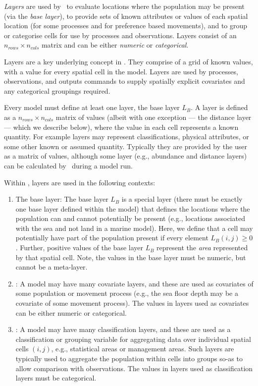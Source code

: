 \emph{Layers} are used by \SPM\ to evaluate locations where the population may be present (via the \emph{base layer}), to provide sets of known attributes or values of each spatial location (for some processes and for preference based movements), and to group or categorise cells for use by processes and observations. Layers consist of an $n_{rows} \times n_{cols}$ matrix and can be either \emph{numeric} or \emph{categorical}. 

Layers are a key underlying concept in \SPM. They comprise of a grid of known values, with a value for every spatial cell in the model. Layers are used by processes, observations, and outputs commands to supply spatially explicit covariates and any categorical groupings required. 

Every model must define at least one layer, the base layer $L_B$. A layer is defined as a $n_{rows} \times n_{cols}$ matrix of values (albeit with one exception --- the distance layer --- which we describe below), where the value in each cell represents a known quantity. For example layers may represent classifications, physical attributes, or some other known or assumed quantity. Typically they are provided by the user as a matrix of values, although some layer (e.g., abundance and distance layers) can be calculated by \SPM\ during a model run. 

Within \SPM, layers are used in the following contexts:
\begin{enumerate}
\item The base layer: The base layer $L_B$ is a special layer (there must be exactly one base layer defined within the model) that defines the locations where the population can and cannot potentially be present (e.g., locations associated with the sea and not land in a marine model). Here, we define that a cell may potentially have part of the population present if every element $L_B(i,j) \ge 0$. Further, positive values of the base layer $L_B$ represent the \emph{area} represented by that spatial cell. Note, the values in the base layer must be numeric, but cannot be a meta-layer.
\item {}: A model may have many covariate layers, and these are used as covariates of some population or movement process (e.g., the sea floor depth may be a covariate of some movement process). The values in layers used as covariates can be either numeric or categorical.
\item {}: A model may have many classification layers, and these are used as a classification or grouping variable for aggregating data over individual spatial cells $(i,j)$, e.g., statistical areas or management areas. Such layers are typically used to aggregate the population within cells into groups so-as to allow comparison with observations. The values in layers used as classification layers must be categorical.
\end{enumerate}

